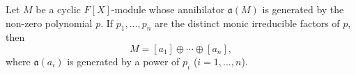 Let $M$ be a cyclic $F[X]$-module whose annihilator $\mathfrak{a}(M)$ is generated by the non-zero polynomial $p$. If $p_1, \ldots, p_n$ are the distinct monic irreducible factors of $p$, then
$$M = [a_1] \oplus \cdots \oplus [a_n],$$
where $\mathfrak{a}(a_i)$ is generated by a power of $p_i$ ($i = 1, \ldots, n$).
